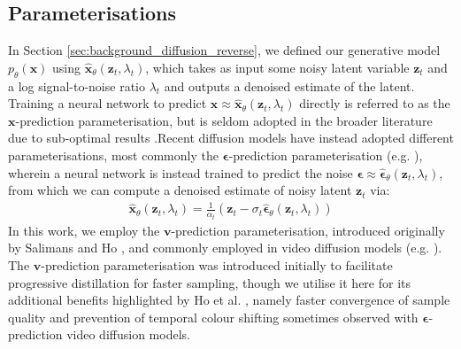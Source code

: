 \documentclass[ oneside,%
                    author={George Herbert},
                    degree={MSci},
                     title={Video Diffusion Models for Climate Simulations},
                  subtitle={}]{dissertation}
\begin{document}
\subsection{Parameterisations}
\label{sec:background_diffusion_parameterisations}

In Section \ref{sec:background_diffusion_reverse}, we defined our generative model $p_\theta(\mathbf{x})$ using $\hat{\mathbf{x}}_\theta(\mathbf{z}_t,\lambda_t)$, which takes as input some noisy latent variable $\mathbf{z}_t$ and a log signal-to-noise ratio $\lambda_t$ and outputs a denoised estimate of the latent. Training a neural network to predict $\mathbf{x}\approx\hat{\mathbf{x}}_\theta(\mathbf{z}_t, \lambda_t)$ directly is referred to as the $\mathbf{x}$-prediction parameterisation, but is seldom adopted in the broader literature due to sub-optimal results \cite{DDPM_Ho}.Recent diffusion models have instead adopted different parameterisations, most commonly the $\boldsymbol\epsilon$-prediction parameterisation (e.g. \cite{DDPM_Ho,Cascaded_Ho,Imagen_Saharia}), wherein a neural network is instead trained to predict the noise $\boldsymbol\epsilon\approx\hat{\boldsymbol\epsilon}_\theta(\mathbf{z}_t,\lambda_t)$, from which we can compute a denoised estimate of noisy latent $\mathbf{z}_t$ via:
\begin{align}
      \hat{\mathbf{x}}_\theta(\mathbf{z}_t,\lambda_t)=\frac{1}{\alpha_t}\left(\mathbf{z}_t-\sigma_t\hat{\boldsymbol\epsilon}_\theta(\mathbf{z}_t, \lambda_t)\right)
\end{align}
In this work, we employ the $\mathbf{v}$-prediction parameterisation, introduced originally by Salimans and Ho \cite{Progressive_Distillation_Salimans}, and commonly employed in video diffusion models (e.g. \cite{VDM_Ho,Imagen_Video_Ho}). The $\mathbf{v}$-prediction parameterisation was introduced initially to facilitate progressive distillation for faster sampling, though we utilise it here for its additional benefits highlighted by Ho et al. \cite{Imagen_Video_Ho}, namely faster convergence of sample quality and prevention of temporal colour shifting sometimes observed with $\boldsymbol\epsilon$-prediction video diffusion models. 
\end{document}
